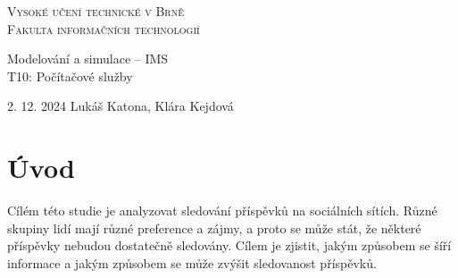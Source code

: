 \documentclass[11pt, a4paper]{article}
\begin{document}
\begin{titlepage}
    \begin{center}
        \textsc{\Huge Vysoké učení technické v Brně\\\vspace{0.5em}\huge Fakulta informačních technologií}
        
        {\LARGE Modelování a simulace -- IMS\\\vspace{0.5em}}
        {\Huge T10: Počítačové služby}
        
    \end{center}
    {\Large 2. 12. 2024 \hfill Lukáš Katona, Klára Kejdová}
\end{titlepage}

\newpage

\section{Úvod}

Cílém této studie je analyzovat sledování příspěvků na sociálních sítích.
Různé skupiny lidí mají různé preference a zájmy, a proto se může stát,
že některé příspěvky nebudou dostatečně sledovány. Cílem je zjistit,
jakým způsobem se šíří informace a jakým způsobem se může zvýšit sledovanost příspěvků.
\end{document}
